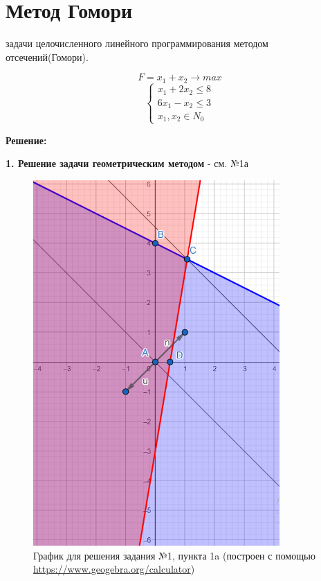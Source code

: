 \chapter{Метод Гомори} { задачи целочисленного линейного программирования методом отсечений(Гомори).}

\begin{equation*}
    F = x_1 + x_2 \rightarrow max
\end{equation*}
\begin{equation*}
    \begin{cases}
        x_1 + 2x_2 \le 8 \\
        6x_1 - x_2 \le 3 \\
        x_1, x_2 \in N_0 
    \end{cases}
\end{equation*}

\begin{center}
    {\bf
    Решение:}
\end{center}

\begin{flushleft}
    {\bf1. Решение задачи геометрическим методом} - см. №1а\\
\end{flushleft}

\begin{figure}[ht]
\centering
\includegraphics[]{пункт а.png}
\centering
\caption{График для решения задания №1, пункта 1a (построен с помощью \url{https://www.geogebra.org/calculator})}
\end{figure}

